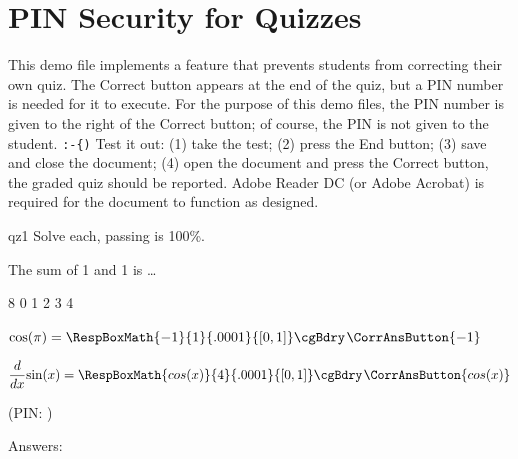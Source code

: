 \documentclass{article}
\let\uif\textsf
\begin{document}
\section*{PIN Security for Quizzes}

This demo file implements a feature that prevents students from
correcting their own quiz. The \uif{Correct} button appears at the end of
the quiz, but a PIN number is needed for it to execute. For the purpose of
this demo files, the PIN number is given to the right of the \uif{Correct}
button; of course, the PIN is not given to the student. \verb~:-{)~ Test it
out: (1) take the test; (2) press the \uif{End} button; (3) save and close
the document; (4) open the document and press the \uif{Correct} button, the
graded quiz should be reported. \textsf{Adobe Reader DC} (or \textsf{Adobe
Acrobat}) is required for the document to function as designed.

\usePINCorrBtn

\begin{quiz*}{qz1}
Solve each, passing is 100\%.
\begin{questions}
    \item The sum of 1 and 1 is \dots
\begin{answers}{8}
\bChoices
   0\eAns
   1\eAns
   2\eAns
   3\eAns
   4\eAns
\eChoices
\end{answers}
  \item $ \cos(\pi) = \RespBoxMath{-1}{1}{.0001}{[0,1]}\cgBdry\kern1bp
\CorrAnsButton{-1} $

\item $\displaystyle\frac{d}{dx}{\sin(x)}=\RespBoxMath{cos(x)}{4}{.0001}{[0,1]}\cgBdry\kern1bp
\CorrAnsButton{cos(x)} $
\end{questions}
\end{quiz*}\quad\ScoreField[\rectW{2.25in}]\currQuiz\olBdry\CorrButton{\currQuiz} (PIN: \numPINId)

\noindent
Answers: \AnswerField\currQuiz

\end{document}
